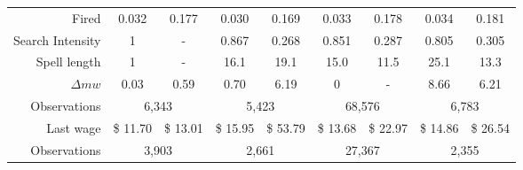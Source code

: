 \documentclass{article}
\begin{document}
\begin{table}[!htbp]
\begin{tabular}{rcccccccc}
		Fired &      0.032 &      0.177 &      0.030 &      0.169 &      0.033 &      0.178 &      0.034 &      0.181 \\
		
		Search Intensity &          1 &          - &      0.867 &      0.268 &      0.851 &      0.287 &      0.805 &      0.305 \\
		
		Spell length &          1 &          - &     16.1 &     19.1 &     15.0 &     11.5 &     25.1 &     13.3 \\
		
		$\Delta mw$ &       0.03 &       0.59 &       0.70 &       6.19 &          0 &          - &       8.66 &       6.21 \\\hdashline
		
		Observations & \multicolumn{ 2}{c}{6,343} & \multicolumn{ 2}{c}{5,423} & \multicolumn{ 2}{c}{68,576} & \multicolumn{ 2}{c}{6,783} \\
		\hline
		Last wage &  \$   11.70  &  \$   13.01  &  \$   15.95  &  \$   53.79  &  \$   13.68  &  \$   22.97  & \$   14.86  &  \$   26.54  \\\hdashline
		
		Observations & \multicolumn{ 2}{c}{3,903} & \multicolumn{ 2}{c}{2,661} & \multicolumn{ 2}{c}{27,367} & \multicolumn{ 2}{c}{2,355} \\
		\hline
		\hline
	\end{tabular}
	\small{}
	\label{summ_table}
\end{table}%
\end{document}
